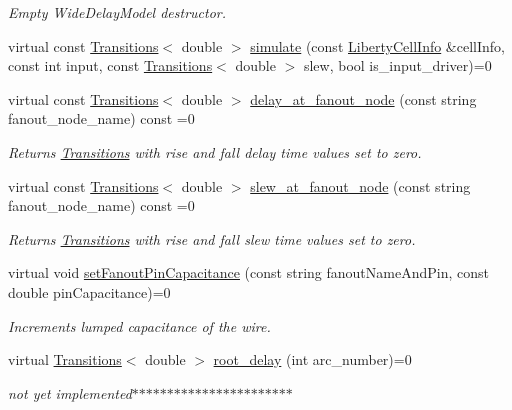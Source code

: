 \begin{DoxyCompactItemize}
\begin{DoxyCompactList}\small\item\em Empty Wide\-Delay\-Model destructor. \end{DoxyCompactList}\item 
virtual const \hyperlink{classTransitions}{Transitions}$<$ double $>$ \hyperlink{classWireDelayModel_a8375f713365be98c03672dbeb28eb930}{simulate} (const \hyperlink{structLibertyCellInfo}{Liberty\-Cell\-Info} \&cell\-Info, const int input, const \hyperlink{classTransitions}{Transitions}$<$ double $>$ slew, bool is\-\_\-input\-\_\-driver)=0
\item 
virtual const \hyperlink{classTransitions}{Transitions}$<$ double $>$ \hyperlink{classWireDelayModel_a45a83dd192bcbf2a70ee13899256fe0d}{delay\-\_\-at\-\_\-fanout\-\_\-node} (const string fanout\-\_\-node\-\_\-name) const =0
\begin{DoxyCompactList}\small\item\em Returns \hyperlink{classTransitions}{Transitions} with rise and fall delay time values set to zero. \end{DoxyCompactList}\item 
virtual const \hyperlink{classTransitions}{Transitions}$<$ double $>$ \hyperlink{classWireDelayModel_adaf486017e2ad91a900a9bef4e6f9340}{slew\-\_\-at\-\_\-fanout\-\_\-node} (const string fanout\-\_\-node\-\_\-name) const =0
\begin{DoxyCompactList}\small\item\em Returns \hyperlink{classTransitions}{Transitions} with rise and fall slew time values set to zero. \end{DoxyCompactList}\item 
virtual void \hyperlink{classWireDelayModel_a27d557bc1f2ed7e5e9787a8a5d82ecb2}{set\-Fanout\-Pin\-Capacitance} (const string fanout\-Name\-And\-Pin, const double pin\-Capacitance)=0
\begin{DoxyCompactList}\small\item\em Increments lumped capacitance of the wire. \end{DoxyCompactList}\item 
virtual \hyperlink{classTransitions}{Transitions}$<$ double $>$ \hyperlink{classWireDelayModel_a4f4ab93810af8ad90fd9fca0b06de141}{root\-\_\-delay} (int arc\-\_\-number)=0
\begin{DoxyCompactList}\small\item\em not yet implemented$\ast$$\ast$$\ast$$\ast$$\ast$$\ast$$\ast$$\ast$$\ast$$\ast$$\ast$$\ast$$\ast$$\ast$$\ast$$\ast$$\ast$$\ast$$\ast$$\ast$$\ast$$\ast$$\ast$ \end{DoxyCompactList}\item 

\end{DoxyCompactItemize}
